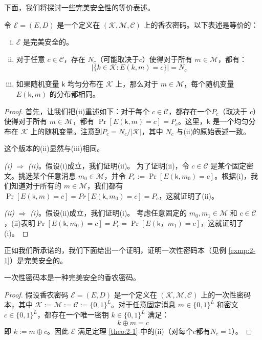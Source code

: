 下面，我们将探讨一些完美安全性的等价表述。

\begin{theorem}\label{theo:2-1}
令 $\mathcal{E}=(E,D)$ 是一个定义在 $(\mathcal{K},\mathcal{M},\mathcal{C})$ 上的香农密码。以下表述是等价的：
\begin{enumerate}[(i)]
	\item $\mathcal{E}$ 是完美安全的。
	\item 对于任意 $c\in\mathcal{C}$，存在 $N_c$（可能取决于$c$）使得对于所有 $m\in\mathcal{M}$，都有：
	\[
    \big\lvert\{k\in\mathcal{K}:E(k,m)=c\}\big\rvert = N_c
    \]
    \item 如果随机变量 $\mathsf{k}$ 均匀分布在 $\mathcal{K}$ 上，那么对于 $m\in\mathcal{M}$，每个随机变量 $E(\mathsf{k},m)$ 的分布都相同。
\end{enumerate}
\end{theorem}

\begin{proof}
首先，让我们把(ii)重述如下：对于每个 $c\in\mathcal{C}$，都存在一个$P_c$（取决于 $c$） 使得对于所有 $m\in\mathcal{M}$，都有 $\Pr[E(\mathsf{k},m)=c]=P_c$。这里，$\mathsf{k}$ 是一个均匀分布在 $\mathcal{K}$ 上的随机变量。注意到$P_c={N_c}/{|\mathcal{K}|}$，其中 $N_c$ 与(ii)的原始表述一致。

这个版本的(ii)显然与(iii)相同。

\vspace{5pt}

\emph{(i)} $\Longrightarrow$ \emph{(ii)}。假设(i)成立，我们证明(ii)。
为了证明(ii)，令 $c\in\mathcal{C}$ 是某个固定密文。挑选某个任意消息 $m_0\in\mathcal{M}$，并令 $P_c:=\Pr[E(\mathsf{k},m_0)=c]$。根据(i)，我们知道对于所有的 $m\in\mathcal{M}$，我们都有 $\Pr[E(\mathsf{k},m)=c]=Pr[E(\mathsf{k},m_0)=c]=P_c$，这就证明了(ii)。

\vspace{5pt}

\emph{(ii)} $\Longrightarrow$ \emph{(i)}。假设(ii)成立，我们证明(i)。
考虑任意固定的 $m_0,m_1\in\mathcal{M}$ 和 $c\in\mathcal{C}$，(ii)表明$\Pr[E(\mathsf{k},m_0)=c]=P_c=\Pr[E(\mathsf{k}，m_1)=c]$，这就证明了(i)。
\end{proof}

正如我们所承诺的，我们下面给出一个证明，证明一次性密码本（见例 \ref{exmp:2-1}）是完美安全的。

\begin{theorem}
一次性密码本是一种完美安全的香农密码。
\end{theorem}

\begin{proof}
假设香农密码 $\mathcal{E}=(E,D)$ 是一个定义在 $(\mathcal{K},\mathcal{M},\mathcal{C})$ 上的一次性密码本，其中 $\mathcal{K}:=\mathcal{M}:=\mathcal{C}:=\{0,1\}^L$。对于任意固定消息 $m\in\{0,1\}^L$ 和密文 $c\in\{0,1\}^L$，都存在一个唯一密钥 $k\in\{0,1\}^L$ 满足：
\[
k\oplus m =c
\]
即 $k:=m\oplus c$。因此 $\mathcal{E}$ 满足定理 \ref{theo:2-1} 中的(ii)（对每个$c$都有$N_c=1$）。
\end{proof}

